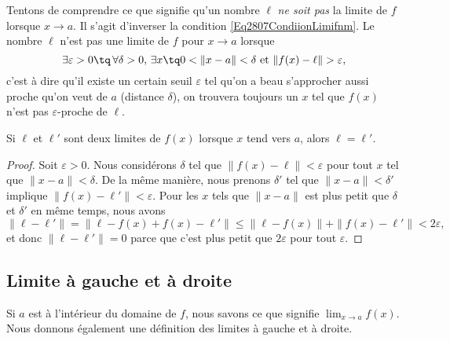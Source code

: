 Tentons de comprendre ce que signifie qu'un nombre $\ell$ \emph{ne soit pas} la limite de $f$ lorsque $x\to a$. Il s'agit d'inverser la condition \eqref{Eq2807CondiionLimifnm}. Le nombre $\ell$ n'est pas une limite de $f$ pour $x\to a$ lorsque
\begin{equation}		\label{EqCaractNonLim}
	\exists\varepsilon>0\tq\,\forall\delta>0,\,\exists x\tq 0<\| x-a \|<\delta\text{ et }\| f(x)-\ell \|>\varepsilon,
\end{equation}
c'est à dire qu'il existe un certain seuil $\varepsilon$ tel qu'on a beau s'approcher aussi proche qu'on veut de $a$ (distance $\delta$), on trouvera toujours un $x$ tel que $f(x)$ n'est pas $\varepsilon$-proche de $\ell$.

\begin{lemma}
	Si $\ell$ et $\ell'$ sont deux limites de $f(x)$ lorsque $x$ tend vers $a$, alors $\ell=\ell'$.
\end{lemma}

\begin{proof}
	Soit $\varepsilon>0$. Nous considérons $\delta$ tel que $\| f(x)-\ell \|<\varepsilon$ pour tout $x$ tel que $\| x-a \|<\delta$. De la même manière, nous prenons $\delta'$ tel que $\| x-a \|<\delta'$ implique $\| f(x)-\ell' \|<\varepsilon$. Pour les $x$ tels que $\| x-a \|$ est plus petit que $\delta$ et $\delta'$ en même temps, nous avons
	\begin{equation}
		\| \ell-\ell' \|=\| \ell-f(x)+f(x)-\ell' \|\leq\| \ell-f(x) \|+\| f(x)-\ell' \|<2\varepsilon,
	\end{equation}
	et donc $\| \ell-\ell' \|=0$ parce que c'est plus petit que $2\varepsilon$ pour tout $\varepsilon$.
\end{proof}

\subsection{Limite à gauche et à droite}

Si \( a\) est à l'intérieur du domaine de \( f\), nous savons ce que signifie \( \lim_{x\to a} f(x)\). Nous donnons également une définition des limites à gauche et à droite.

